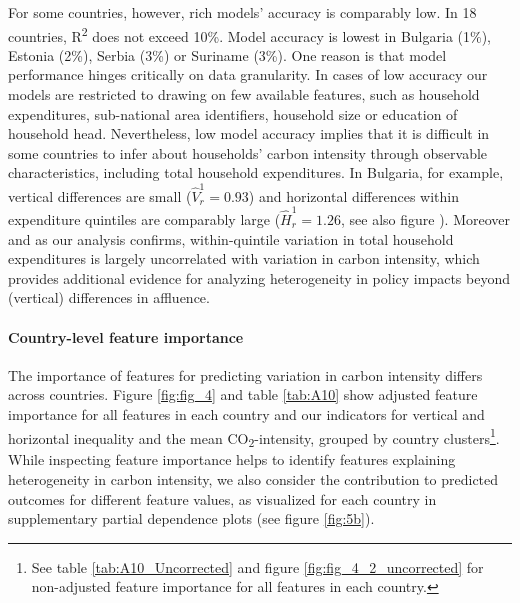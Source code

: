 \documentclass[12pt, a4paper]{article}
\begin{document}
For some countries, however, rich models' accuracy is comparably low. In 18 countries, R\textsuperscript{2} does not exceed 10\%. Model accuracy is lowest in Bulgaria (1\%), Estonia (2\%), Serbia (3\%) or Suriname (3\%). One reason is that model performance hinges critically on data granularity. In cases of low accuracy our models are restricted to drawing on few available features, such as household expenditures, sub-national area identifiers, household size or education of household head. Nevertheless, low model accuracy implies that it is difficult in some countries to infer about households' carbon intensity through observable characteristics, including total household expenditures. In Bulgaria, for example, vertical differences are small ($\widehat{V}_{r}^{1}=0.93$) and horizontal differences within expenditure quintiles are comparably large ($\widehat{H}_{r}^{1}=1.26$, see also figure ). Moreover and as our analysis confirms, within-quintile variation in total household expenditures is largely uncorrelated with variation in carbon intensity, which provides additional evidence for analyzing heterogeneity in policy impacts beyond (vertical) differences in affluence.

\paragraph{Country-level feature importance}
The importance of features for predicting variation in carbon intensity differs across countries. Figure \ref{fig:fig_4} and table \ref{tab:A10} show adjusted feature importance for all features in each country and our indicators for vertical and horizontal inequality and the mean CO\textsubscript{2}-intensity, grouped by country clusters\footnote{See table \ref{tab:A10_Uncorrected} and figure \ref{fig:fig_4_2_uncorrected} for non-adjusted feature importance for all features in each country.}. While inspecting feature importance helps to identify features explaining heterogeneity in carbon intensity, we also consider the contribution to predicted outcomes for different feature values, as visualized for each country in supplementary partial dependence plots (see figure \ref{fig:5b}).
\end{document}
